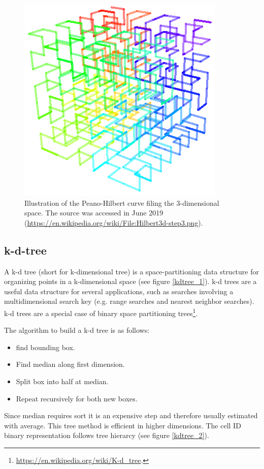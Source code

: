 \documentclass[12pt]{article}
\theoremstyle{plain}
\begin{document}
\begin{figure}[h!]
   \centering
	\includegraphics[width=.6\linewidth]{media/Hilbert3d-step3.png}
	\caption{Illustration of the Peano-Hilbert curve filing the 3-dimensional space. The source was accessed in June 2019 (\url{https://en.wikipedia.org/wiki/File:Hilbert3d-step3.png}).}
	\label{PHcurve}
\end{figure}

\subsection{k-d-tree}

A k-d tree (short for k-dimensional tree) is a space-partitioning data structure for organizing points in a k-dimensional space (see figure \ref{kdtree_1}). k-d trees are a useful data structure for several applications, such as searches involving a multidimensional search key (e.g. range searches and nearest neighbor searches). k-d trees are a special case of binary space partitioning trees\footnote{\url{https://en.wikipedia.org/wiki/K-d_tree}.}.

The algorithm to build a k-d tree is as follows:

\begin{itemize}
	\item find bounding box.
	\item Find median along first dimension.
	\item Split box into half at median.
	\item Repeat recursively for both new boxes.
\end{itemize}

Since median requires sort it is an expensive step and therefore usually estimated with average. This tree method is efficient in higher dimensions. The cell ID binary representation follows tree hierarcy (see figure \ref{kdtree_2}). 
\end{document}
